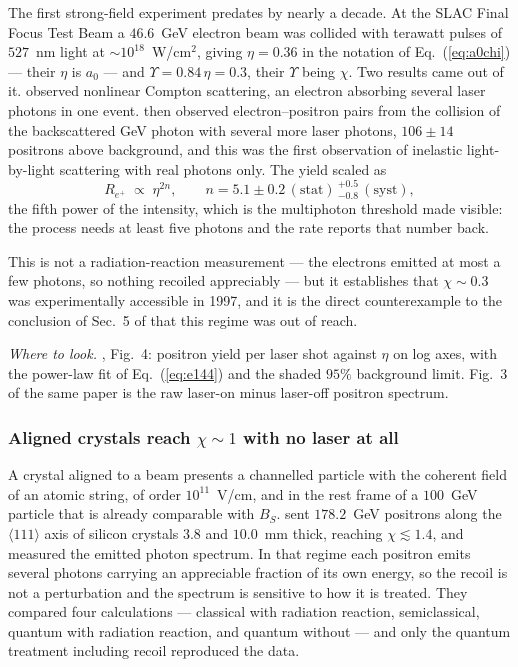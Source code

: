 \documentclass[preprint]{aastex701}
\begin{document}
The first strong-field experiment predates \citet{zhang2006} by nearly a decade.
At the SLAC Final Focus Test Beam a $46.6$~GeV electron beam was collided with
terawatt pulses of $527$~nm light at $\sim10^{18}$~W/cm$^2$, giving $\eta=0.36$
in the notation of Eq.~(\ref{eq:a0chi}) --- their $\eta$ is $a_0$ --- and
$\Upsilon=0.84\,\eta=0.3$, their $\Upsilon$ being $\chi$. Two results came out
of it. \citet{bula1996} observed nonlinear Compton scattering, an electron
absorbing several laser photons in one event. \citet{burke1997} then observed
electron--positron pairs from the collision of the backscattered GeV photon
with several more laser photons, $106\pm14$ positrons above background, and
this was the first observation of inelastic light-by-light scattering with real
photons only. The yield scaled as
\begin{equation}
R_{e^+} \;\propto\; \eta^{2n},
\qquad
n = 5.1\pm0.2\,(\mathrm{stat})\,^{+0.5}_{-0.8}\,(\mathrm{syst}),
\label{eq:e144}
\end{equation}
the fifth power of the intensity, which is the multiphoton threshold made
visible: the process needs at least five photons and the rate reports that
number back.

This is not a radiation-reaction measurement --- the electrons emitted at most
a few photons, so nothing recoiled appreciably --- but it establishes that
$\chi\sim0.3$ was experimentally accessible in 1997, and it is the direct
counterexample to the conclusion of Sec.~5 of \citet{zhang2006} that this
regime was out of reach.

\emph{Where to look.} \citet{burke1997}, Fig.~4: positron yield per laser shot
against $\eta$ on log axes, with the power-law fit of Eq.~(\ref{eq:e144}) and
the shaded $95\%$ background limit. Fig.~3 of the same paper is the raw
laser-on minus laser-off positron spectrum.

\subsubsection{Aligned crystals reach $\chi\sim1$ with no laser at all}
\label{sec:crystal}

A crystal aligned to a beam presents a channelled particle with the coherent
field of an atomic string, of order $10^{11}$~V/cm, and in the rest frame of a
$100$~GeV particle that is already comparable with $B_S$.
\citet{wistisen2018} sent $178.2$~GeV positrons along the $\langle111\rangle$
axis of silicon crystals $3.8$ and $10.0$~mm thick, reaching $\chi\lesssim1.4$,
and measured the emitted photon spectrum. In that regime each positron emits
several photons carrying an appreciable fraction of its own energy, so the
recoil is not a perturbation and the spectrum is sensitive to how it is
treated. They compared four calculations --- classical with radiation reaction,
semiclassical, quantum with radiation reaction, and quantum without --- and only
the quantum treatment including recoil reproduced the data.
\end{document}
